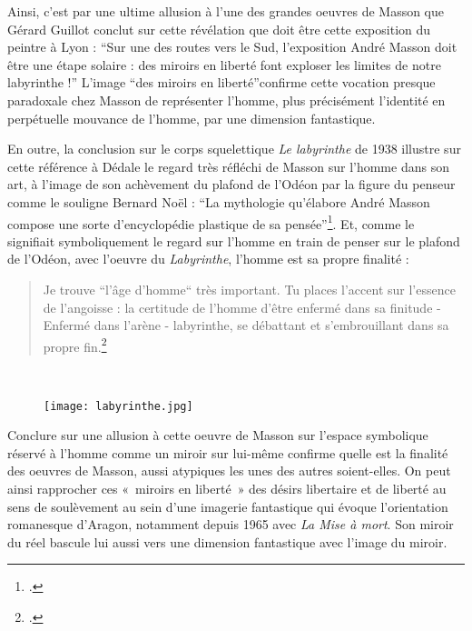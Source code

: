 	 Ainsi, c’est par une ultime allusion à l’une des grandes oeuvres de Masson que Gérard Guillot conclut sur cette révélation que doit être cette exposition du peintre à Lyon : \enquote{Sur une des routes vers le Sud, l’exposition André Masson doit être une étape solaire : des miroirs en liberté font exploser les limites de notre labyrinthe !} L’image \enquote{des miroirs en liberté}confirme cette vocation presque paradoxale chez Masson de représenter l’homme, plus précisément l’identité en perpétuelle mouvance de l’homme, par une dimension fantastique.

	En outre, la conclusion sur le corps squelettique \emph{Le labyrinthe} de 1938 illustre sur cette référence à Dédale le regard très réfléchi de Masson sur l’homme dans son art, à l’image de son achèvement du plafond de l’Odéon par la figure du penseur comme le souligne Bernard Noël : \enquote{La mythologie qu’élabore André Masson compose une sorte d’encyclopédie plastique de sa pensée}\footcite[p73]{noel}. Et, comme le signifiait symboliquement le regard sur l’homme en train de penser sur le plafond de l’Odéon, avec l’oeuvre du \emph{Labyrinthe}, l’homme est sa propre finalité : 

\begin{quote}
Je trouve “l’âge d’homme“ très important. Tu places l’accent sur l’essence de l’angoisse : la certitude de l’homme d’être enfermé dans sa finitude - Enfermé dans l’arène - labyrinthe, se débattant et s’embrouillant dans sa propre fin.\footcite[p429]{anneessurrealistes}	
\end{quote}
 

\begin{figure}[H]
   \centering
   \texttt{[image: labyrinthe.jpg]}
	\caption{\cite{labyrinthe}}\label{fig:Labyrinthe}
\end{figure}


	 Conclure sur une allusion à cette oeuvre de Masson sur l’espace symbolique réservé à l’homme comme un miroir sur lui-même confirme quelle est la finalité des oeuvres de Masson, aussi atypiques les unes des autres soient-elles. On peut ainsi rapprocher ces « miroirs en liberté » des désirs libertaire et de liberté au sens de soulèvement au sein d’une imagerie fantastique qui évoque l’orientation romanesque d’Aragon, notamment depuis 1965 avec \emph{La Mise à mort}. Son miroir du réel bascule lui aussi vers une dimension fantastique avec l’image du miroir. 

